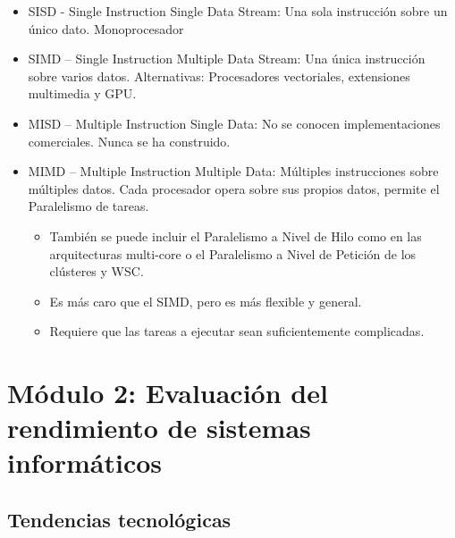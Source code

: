 \documentclass[12pt, twoside, openright]{report} %
\begin{document}
\begin{itemize}

	\item SISD - Single Instruction Single Data Stream: Una sola instrucción
	      sobre un único dato. Monoprocesador

	\item SIMD -- Single Instruction Multiple Data Stream: Una única
	      instrucción sobre varios datos. Alternativas: Procesadores vectoriales, extensiones multimedia y
	      GPU.

	\item MISD -- Multiple Instruction Single Data: No se conocen
	      implementaciones comerciales. Nunca se ha construido.
	\item MIMD -- Multiple Instruction Multiple Data: Múltiples instrucciones
	      sobre múltiples datos. Cada procesador opera sobre sus propios
	      datos, permite el Paralelismo de tareas.

	      \begin{itemize}

		      \item También se puede incluir el Paralelismo a Nivel de Hilo como en
		            las arquitecturas multi-core o el Paralelismo a Nivel de Petición
		            de los clústeres y WSC.
		      \item Es más caro que el SIMD, pero es más flexible y general.
		      \item Requiere que las tareas a ejecutar sean suficientemente
		            complicadas.
	      \end{itemize}
\end{itemize}

\chapter{Módulo 2: Evaluación del rendimiento de sistemas informáticos}
\section{Tendencias tecnológicas}
\end{document}
